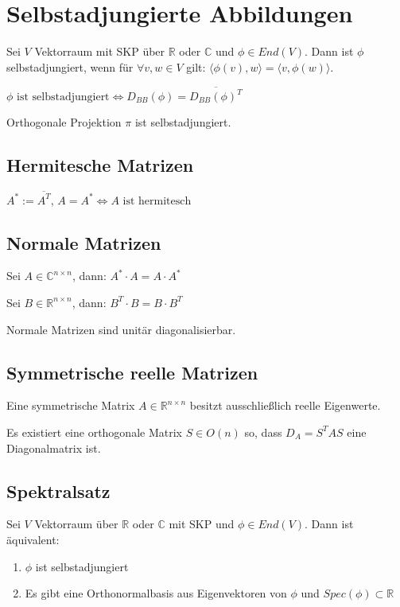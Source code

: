 \section*{Selbstadjungierte Abbildungen}

Sei $V$ Vektorraum mit SKP über $\mathbb{R}$ oder $\mathbb{C}$ und $\phi \in End(V)$. Dann ist $\phi$ selbstadjungiert, wenn für $\forall v, w \in V$ gilt: $\langle \phi(v), w \rangle = \langle v, \phi(w) \rangle$.

$\phi \text{ ist selbstadjungiert} \Leftrightarrow D_{BB}(\phi)=\overline{D_{BB}(\phi)^T}$

Orthogonale Projektion $\pi$ ist selbstadjungiert.

\subsection*{Hermitesche Matrizen}

$A^* := \overline{A^T}$, $A = A^* \Leftrightarrow A \text{ ist hermitesch}$

\subsection*{Normale Matrizen}

Sei $A \in \mathbb{C}^{n\times n}$, dann: $A^* \cdot A = A \cdot A^*$

Sei $B \in \mathbb{R}^{n\times n}$, dann: $B^T \cdot B = B \cdot B^T$

Normale Matrizen sind unitär diagonalisierbar.

\subsection*{Symmetrische reelle Matrizen}

Eine symmetrische Matrix $A \in \mathbb{R}^{n\times n}$ besitzt ausschließlich reelle Eigenwerte.

Es existiert eine orthogonale Matrix $S \in O(n)$ so, dass $D_A = S^TAS$ eine Diagonalmatrix ist.

\subsection*{Spektralsatz}

Sei $V$ Vektorraum über $\mathbb{R}$ oder $\mathbb{C}$ mit SKP und $\phi \in End(V)$. Dann ist äquivalent:

\begin{enumerate}[label=(\alph*)]
	\item $\phi$ ist selbstadjungiert
	\item Es gibt eine Orthonormalbasis aus Eigenvektoren von $\phi$ und $Spec(\phi) \subset \mathbb{R}$
\end{enumerate}


